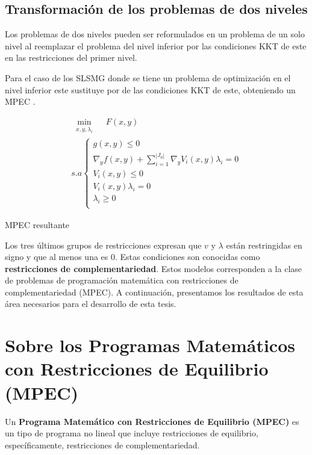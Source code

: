 \subsection{Transformación de los problemas de dos niveles}
		
		Los problemas de dos niveles pueden ser reformulados en un problema de un solo nivel al reemplazar el problema del nivel inferior por las condiciones KKT de este en las restricciones del primer nivel. 
		
		Para el caso de los SLSMG donde se tiene un problema de optimización en el nivel inferior este sustituye por de las condiciones KKT de este, obteniendo un MPEC \autocite{aussel2020}.
        
		\begin{table}[H]

		\[\begin{array}{l}
			\underset{\substack{x, y, \lambda_i}}{\min} \quad F(x, y)\\
			s.a \left\{ \begin{array}{l}
				
				g(x, y) \leq 0\\
				\nabla_{y} f(x, y) + \sum_{i=1}^{|J_{0}|} \nabla_{y} V_i(x, y) \lambda_i = 0 \\
				V_i(x, y) \leq 0 \\
				V_i(x, y)\lambda_i = 0 \\
				\lambda_i \geq 0\\
			\end{array}\right.
            \tag{\theequation}
		\end{array}\]
        \label{eq:KKT_Optimista}
		\caption*{MPEC resultante}
		\end{table}
Los tres últimos grupos de restricciones expresan que $v$ y $\lambda$ están restringidas en signo y que al menos una es 0. Estas condiciones son conocidas como \textbf{restricciones de complementariedad}. Estos modelos corresponden a la clase de problemas de programación matemática con restricciones de complementariedad (MPEC). A continuación, presentamos los resultados de esta área necesarios para el desarrollo de esta tesis.

\section{Sobre los Programas Matemáticos con Restricciones de Equilibrio (MPEC)}
Un \textbf{Programa Matemático con Restricciones de Equilibrio (MPEC)} es un tipo de programa no lineal que incluye restricciones de equilibrio, específicamente, restricciones de complementariedad.

